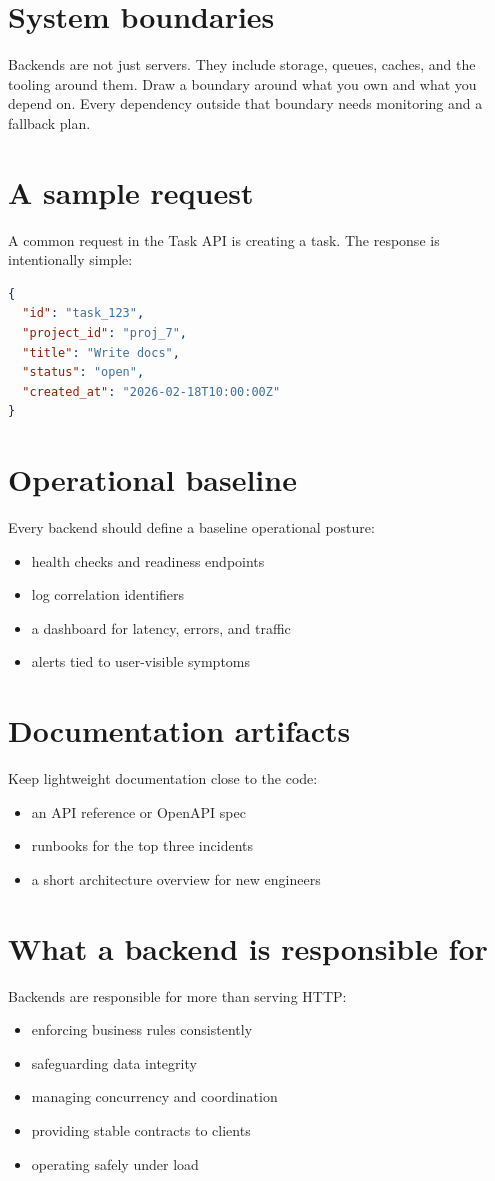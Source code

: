\section{System boundaries}
Backends are not just servers.
They include storage, queues, caches, and the tooling around them.
Draw a boundary around what you own and what you depend on.
Every dependency outside that boundary needs monitoring and a fallback plan.

\section{A sample request}
A common request in the Task API is creating a task.
The response is intentionally simple:

\begin{lstlisting}[language=JSON]
{
  "id": "task_123",
  "project_id": "proj_7",
  "title": "Write docs",
  "status": "open",
  "created_at": "2026-02-18T10:00:00Z"
}
\end{lstlisting}

\section{Operational baseline}
Every backend should define a baseline operational posture:
\begin{itemize}[nosep]
  \item health checks and readiness endpoints
  \item log correlation identifiers
  \item a dashboard for latency, errors, and traffic
  \item alerts tied to user-visible symptoms
\end{itemize}

\section{Documentation artifacts}
Keep lightweight documentation close to the code:
\begin{itemize}[nosep]
  \item an API reference or OpenAPI spec
  \item runbooks for the top three incidents
  \item a short architecture overview for new engineers
\end{itemize}

\section{What a backend is responsible for}
Backends are responsible for more than serving HTTP:
\begin{itemize}[nosep]
  \item enforcing business rules consistently
  \item safeguarding data integrity
  \item managing concurrency and coordination
  \item providing stable contracts to clients
  \item operating safely under load
\end{itemize}

